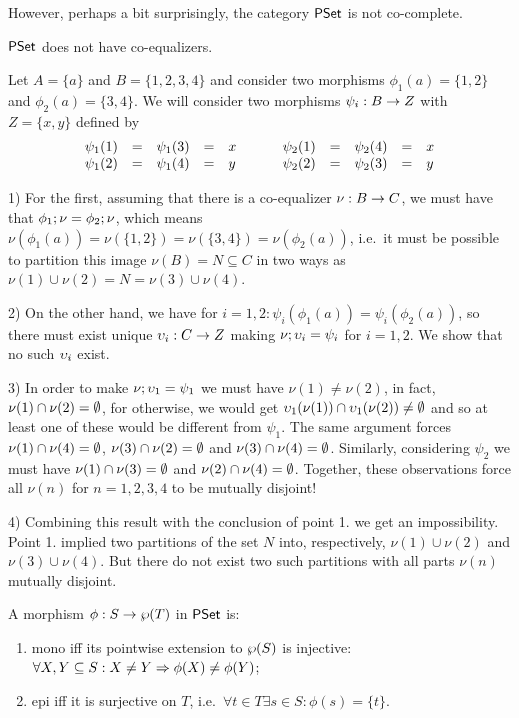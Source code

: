 \documentclass[10pt]{article}
\begin{document}
\noindent
However, perhaps a bit surprisingly, the category $\mbox{\rm\sf PSet}$ is not co-complete.

\begin{Lemma}
\label{le:PSnocoeq}
$\mbox{\rm\sf PSet}$ does not have co-equalizers.
\end{Lemma}

\begin{Proof}
Let $A=\{a\}$ and $B=\{1,2,3,4\}$ and consider two morphisms
$\phi_1(a)=\{1,2\}$ and $\phi_2(a)=\{3,4\}$. We will consider two
morphisms $\psi_i:B\rightarrow Z$ with $Z=\{x,y\}$ defined by
\[
\begin{array}{rcccl@{\ \ \ \ \ \ \ \ \ \ }rcccl}
\psi_1(1) & = & \psi_1(3) & =& x &  \psi_2(1) & = & \psi_2(4) & = & x \\
\psi_1(2) & = & \psi_1(4) & =& y &   \psi_2(2) & = &\psi_2(3) & = & y \\
\end{array} 
\]

1) For the first, assuming that there is a co-equalizer $\nu:B\rightarrow
C$, we must have that $\phi_1;\nu=\phi_2;\nu$, which means
$\nu(\phi_1(a))=\nu(\{1,2\})=\nu(\{3,4\})=\nu(\phi_2(a))$, i.e.\ it
must be possible to partition this image $\nu(B)=N\subseteq C$ in two
ways as $\nu(1)\cup\nu(2)=N=\nu(3)\cup\nu(4)$.

2) On the other hand, we have for $i=1,2:
\psi_i(\phi_1(a))=\psi_i(\phi_2(a))$, so there must exist unique
$\upsilon_i:C\rightarrow Z$ making $\nu;\upsilon_i=\psi_i$ for $i=1,2$. We
show that no such $\upsilon_i$ exist.

3) In order to make $\nu;\upsilon_1=\psi_1$ we must have
$\nu(1)\not=\nu(2)$, in fact, $\nu(1)\cap\nu(2)=\emptyset$, for otherwise,
we would get $\upsilon_1(\nu(1))\cap\upsilon_1(\nu(2))\not=\emptyset$ and so at
least one of these would be different from $\psi_1$. The same argument
forces $\nu(1)\cap\nu(4)=\emptyset$, $\nu(3)\cap\nu(2)=\emptyset$ and
$\nu(3)\cap\nu(4)=\emptyset$.  Similarly, considering $\psi_2$ we must have
$\nu(1)\cap\nu(3)=\emptyset$ and $\nu(2)\cap\nu(4)=\emptyset$.  Together, these
observations force all $\nu(n)$ for $n=1,2,3,4$ to be mutually
disjoint!

4) Combining this result with the conclusion of point 1. we get an
impossibility. Point 1. implied two partitions of the set $N$ into,
respectively, $\nu(1)\cup \nu(2)$ and $\nu(3)\cup\nu(4)$. But there do
not exist two such partitions with all parts $\nu(n)$ mutually
disjoint.
\end{Proof}

\begin{Lemma}
\label{le:charepimono}
A morphism $\phi:S\rightarrow \wp(T)$ in $\mbox{\rm\sf PSet}$ is:

\begin{enumerate}\MyLPar
\item 
mono iff its pointwise extension to $\wp(S)$ is injective:
$\forall X,Y\subseteq S: X\not=Y \Rightarrow \phi(X)\not=\phi(Y)$;
\item 
epi iff it is surjective on $T$, i.e.\ $\forall t\in T \exists s\in S:
\phi(s)=\{t\}$.
\end{enumerate}

\end{Lemma}
\end{document}
